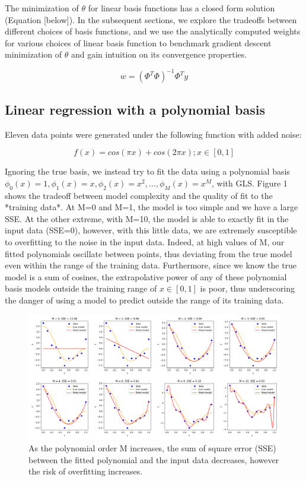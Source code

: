 \documentclass[12pt]{article}
\begin{document}
The minimization of $\theta$ for linear basis functions has a closed form solution (Equation [below]). In the subsequent sections, we explore the tradeoffs between different choices of basis functions, and we use the analytically computed weights for various choices of linear basis function to benchmark gradient descent minimization of $\theta$ and gain intuition on its convergence properties. 

$$w = (\Phi^T\Phi)^{-1}\Phi^Ty$$

\subsection{Linear regression with a polynomial basis}

Eleven data points were generated under the following function with added noise:


$$f(x) = cos(\pi x) + cos(2\pi x); x \in [0,1]$$



Ignoring the true basis, we instead try to fit the data using a polynomial basis $\phi_0(x) = 1, \phi_1(x) = x, \phi_2(x) = x^2, ... , \phi_M(x) = x^M$, with GLS.  Figure 1 shows the tradeoff between model complexity and the quality of fit to the *training data*. At M=0 and M=1, the model is too simple and we have a large SSE. At the other extreme, with M=10, the model is able to exactly fit in the input data (SSE=0), however, with this little data, we are extremely susceptible to overfitting to the noise in the input data. Indeed, at high values of M, our fitted polynomials oscillate between points, thus deviating from the true model even within the range of the training data. Furthermore, since we know the true model is a sum of cosines, the extrapolative power of any of these polynomial basis models outside the training range of $x \in [0,1]$ is poor, thus underscoring the danger of using a model to predict outside the range of its training data.

\begin{figure}
\caption{As the polynomial order M increases, the sum of square error (SSE) between the fitted polynomial and the input data decreases, however the risk of overfitting increases.}
\begin{center}
\includegraphics[width=450px]{all_regress_m}
\end{center}
\end{figure}
\end{document}
